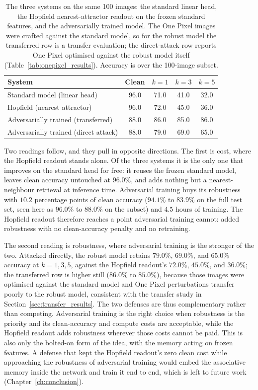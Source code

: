 \begin{table}[ht]
    \centering
    \caption{The three systems on the same 100 images: the standard linear head, the Hopfield nearest-attractor readout on the frozen standard features, and the adversarially trained model. The One Pixel images were crafted against the standard model, so for the robust model the transferred row is a transfer evaluation; the direct-attack row reports One Pixel optimised against the robust model itself (Table~\ref{tab:onepixel_results}). Accuracy is over the 100-image subset.}
    \label{tab:hopfield_vs_adv}
    \begin{tabular}{lcccc}
        \toprule
        \textbf{System} & \textbf{Clean} & \textbf{$k=1$} & \textbf{$k=3$} & \textbf{$k=5$} \\
        \midrule
        Standard model (linear head) & 96.0 & 71.0 & 41.0 & 32.0 \\
        Hopfield (nearest attractor) & 96.0 & 72.0 & 45.0 & 36.0 \\
        Adversarially trained (transferred) & 88.0 & 86.0 & 85.0 & 86.0 \\
        Adversarially trained (direct attack) & 88.0 & 79.0 & 69.0 & 65.0 \\
        \bottomrule
    \end{tabular}
\end{table}

Two readings follow, and they pull in opposite directions. The first is cost, where the Hopfield readout stands alone. Of the three systems it is the only one that improves on the standard head for free: it reuses the frozen standard model, leaves clean accuracy untouched at $96.0\%$, and adds nothing but a nearest-neighbour retrieval at inference time. Adversarial training buys its robustness with $10.2$ percentage points of clean accuracy ($94.1\%$ to $83.9\%$ on the full test set, seen here as $96.0\%$ to $88.0\%$ on the subset) and $4.5$ hours of training. The Hopfield readout therefore reaches a point adversarial training cannot: added robustness with no clean-accuracy penalty and no retraining.

The second reading is robustness, where adversarial training is the stronger of the two. Attacked directly, the robust model retains $79.0\%$, $69.0\%$, and $65.0\%$ accuracy at $k = 1, 3, 5$, against the Hopfield readout's $72.0\%$, $45.0\%$, and $36.0\%$; the transferred row is higher still ($86.0\%$ to $85.0\%$), because those images were optimised against the standard model and One Pixel perturbations transfer poorly to the robust model, consistent with the transfer study in Section~\ref{sec:transfer_results}. The two defenses are thus complementary rather than competing. Adversarial training is the right choice when robustness is the priority and its clean-accuracy and compute costs are acceptable, while the Hopfield readout adds robustness wherever those costs cannot be paid. This is also only the bolted-on form of the idea, with the memory acting on frozen features. A defense that kept the Hopfield readout's zero clean cost while approaching the robustness of adversarial training would embed the associative memory inside the network and train it end to end, which is left to future work (Chapter~\ref{ch:conclusion}).

